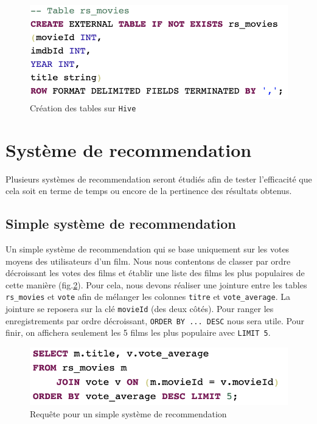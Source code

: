 \documentclass[a4paper, 12pt, oneside]{book}
\begin{document}
\begin{figure}[H]
  \centering
  \includegraphics[width=1.0\textwidth]{images/hive-init}
  \caption{Création des tables sur \texttt{Hive}}
  \label{fig:hive-init}
\end{figure}

\section[Hive]{Système de recommendation}
Plusieurs systèmes de recommendation seront étudiés afin de tester l'efficacité que cela soit en terme de temps ou encore de la pertinence des résultats obtenus.
\subsection{Simple système de recommendation}
Un simple système de recommendation qui se base uniquement sur les votes moyens des utilisateurs d'un film. Nous nous contentons de classer par ordre décroissant les votes des films et établir une liste des films les plus populaires de cette manière (fig.\ref{fig:hive-popular}). 
\newline
Pour cela, nous devons réaliser une jointure entre les tables \texttt{rs\_movies} et \texttt{vote} afin de mélanger les colonnes \texttt{titre} et \texttt{vote\_average}. La jointure se reposera sur la clé \texttt{movieId} (des deux côtés). Pour ranger les enregistrements par ordre décroissant, \texttt{ORDER BY ... DESC} nous sera utile. Pour finir, on affichera seulement les 5 films les plus populaire avec \texttt{LIMIT 5}.

\begin{figure}[H]
  \centering
  \includegraphics[width=1.0\textwidth]{images/hive-popular}
  \caption{Requête pour un simple système de recommendation}
  \label{fig:hive-popular}
\end{figure}
\end{document}
